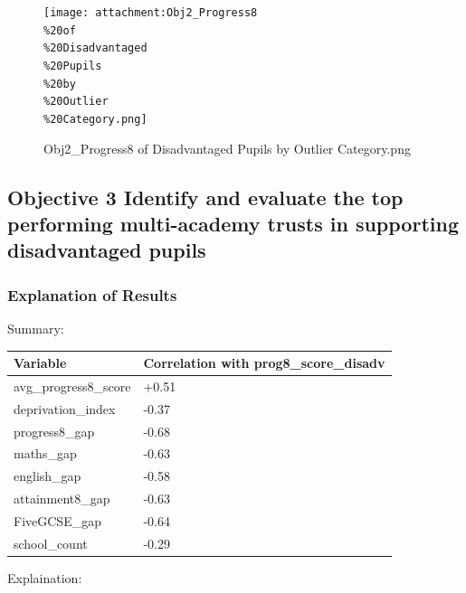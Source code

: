 \documentclass[
  letterpaper,
  DIV=11,
  numbers=noendperiod]{scrartcl}
\begin{document}
\begin{figure}[H]

{\centering \texttt{[image: attachment:Obj2\_Progress8\\\%20of\\\%20Disadvantaged\\\%20Pupils\\\%20by\\\%20Outlier\\\%20Category.png]}

}

\caption{Obj2\_Progress8 of Disadvantaged Pupils by Outlier
Category.png}

\end{figure}%

\subsection{Objective 3 Identify and evaluate the top performing
multi-academy trusts in supporting disadvantaged
pupils}\label{objective-3-identify-and-evaluate-the-top-performing-multi-academy-trusts-in-supporting-disadvantaged-pupils}

\subsubsection{Explanation of Results}\label{explanation-of-results-1}

Summary:

\begin{longtable}[]{@{}ll@{}}
\toprule\noalign{}
Variable & Correlation with prog8\_score\_disadv \\
\midrule\noalign{}
\endhead
\bottomrule\noalign{}
\endlastfoot
avg\_progress8\_score & +0.51 \\
deprivation\_index & -0.37 \\
progress8\_gap & -0.68 \\
maths\_gap & -0.63 \\
english\_gap & -0.58 \\
attainment8\_gap & -0.63 \\
FiveGCSE\_gap & -0.64 \\
school\_count & -0.29 \\
\end{longtable}

Explaination:
\end{document}
